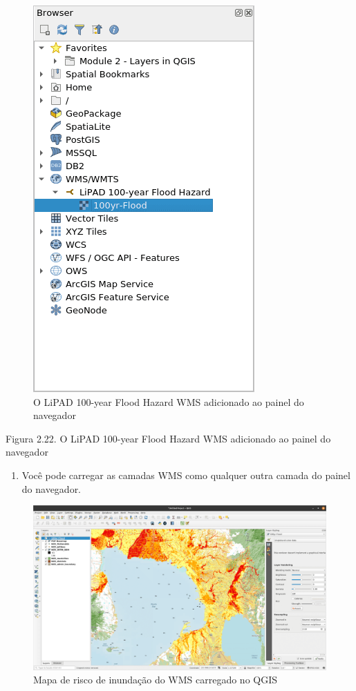 \documentclass[
]{krantz}
\providecommand{\tightlist}{%
  \setlength{\itemsep}{0pt}\setlength{\parskip}{0pt}}
\begin{document}
\begin{figure}
\centering
\includegraphics{media/modulo2/wms-2.png}
\caption{O LiPAD 100-year Flood Hazard WMS adicionado ao painel do navegador}
\end{figure}

Figura 2.22. O LiPAD 100-year Flood Hazard WMS adicionado ao painel do navegador

\begin{enumerate}
\def\labelenumi{\arabic{enumi}.}
\setcounter{enumi}{5}
\tightlist
\item
  Você pode carregar as camadas WMS como qualquer outra camada do painel do navegador.
\end{enumerate}

\begin{figure}
\centering
\includegraphics{media/modulo2/wms-3.png}
\caption{Mapa de risco de inundação do WMS carregado no QGIS}
\end{figure}
\end{document}
